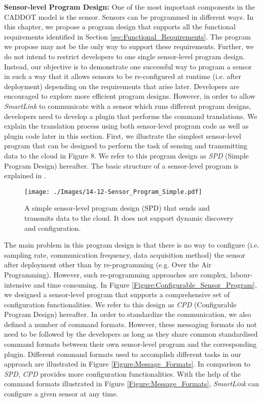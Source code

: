 \documentclass[graybox]{svmult}
\begin{document}
\textbf{Sensor-level Program Design:}
One of the most important components in the CADDOT model is the sensor. Sensors can be programmed in different ways. In this chapter, we propose a program design that supports all the functional requirements identified in Section \ref{sec:Functional_Requirements}. The program we propose may not be the only way to support these requirements. Further, we do not intend to restrict developers to one single sensor-level program design. Instead, our objective is to demonstrate one successful way to program a sensor in such a way that it allows sensors to be re-configured at runtime (i.e. after deployment) depending on the requirements that arise later. Developers are encouraged to explore more efficient program designs. However, in order to allow \textit{SmartLink} to communicate with a sensor which runs different program designs, developers need to develop a plugin that performs the command translations. We explain the translation process using both sensor-level program code as well as plugin code later in this section. First, we illustrate the simplest sensor-level program that can be designed to perform the task of sensing and transmitting data to the cloud in Figure 8. We refer to this program design as \textit{SPD} (Simple Program Design) hereafter. The basic structure of a sensor-level program is explained in \cite{P595}.




\begin{figure}[t]
 \centering
\texttt{[image: ./Images/14-12-Sensor\_Program\_Simple.pdf]}
\caption{A simple sensor-level program design (SPD) that sends and transmits data to the cloud. It does not support dynamic discovery and configuration.}
 \label{Figure:Simple_Sensor_Program}
\end{figure}


The main problem in this program design is that there is no way to configure (i.e. sampling rate, communication frequency, data acquisition method) the sensor after deployment other than by re-programming (e.g. Over the Air Programming). However, such re-programming approaches are complex, labour-intensive and time consuming. In Figure  \ref{Figure:Configurable_Sensor_Program}, we designed a sensor-level program that supports a comprehensive set of configuration functionalities. We refer to this design as \textit{CPD} (Configurable Program Design) hereafter. In order to standardize the communication, we also defined a number of command formats. However, these messaging formats do not need to be followed by the developers as long as they share common standardised command formats between their own sensor-level program and the corresponding plugin. Different command formats used to accomplish different tasks in our approach are illustrated in Figure \ref{Figure:Message_Formats}. In comparison to \textit{SPD}, \textit{CPD} provides more configuration functionalities. With the help of the command formats illustrated in Figure \ref{Figure:Message_Formats}, \textit{SmartLink} can configure a given sensor at any time.
\end{document}
